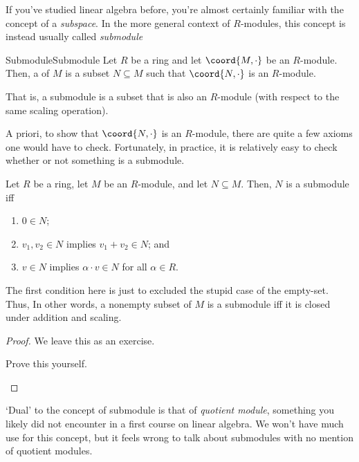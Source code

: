 If you've studied linear algebra before, you're almost certainly familiar with the concept of a \emph{subspace}.  In the more general context of $R$-modules, this concept is instead usually called \emph{submodule}
\begin{dfn}{Submodule}{Submodule}
Let $R$ be a ring and let $\coord{M,\cdot}$ be an $R$-module.  Then, a  of $M$ is a subset $N\subseteq M$ such that $\coord{N,\cdot}$ is an $R$-module.
\begin{rmk}
That is, a submodule is a subset that is also an $R$-module (with respect to the same scaling operation).
\end{rmk}
\end{dfn}
A priori, to show that $\coord{N,\cdot}$ is an $R$-module, there are quite a few axioms one would have to check.  Fortunately, in practice, it is relatively easy to check whether or not something is a submodule.
\begin{prp}{}{}
Let $R$ be a ring, let $M$ be an $R$-module, and let $N\subseteq M$.  Then, $N$ is a submodule iff
\begin{enumerate}
\item $0\in N$;
\item $v_1,v_2\in N$ implies $v_1+v_2\in N$; and
\item $v\in N$ implies $\alpha \cdot v\in N$ for all $\alpha \in R$.
\end{enumerate}
\begin{rmk}
The first condition here is just to excluded the stupid case of the empty-set.  Thus, In other words, a nonempty subset of $M$ is a submodule iff it is closed under addition and scaling.
\end{rmk}
\begin{proof}
We leave this as an exercise.
\begin{exr}{}{}
Prove this yourself.
\end{exr}
\end{proof}
\end{prp}
`Dual' to the concept of submodule is that of \emph{quotient module}, something you likely did not encounter in a first course on linear algebra.  We won't have much use for this concept, but it feels wrong to talk about submodules with no mention of quotient modules.

